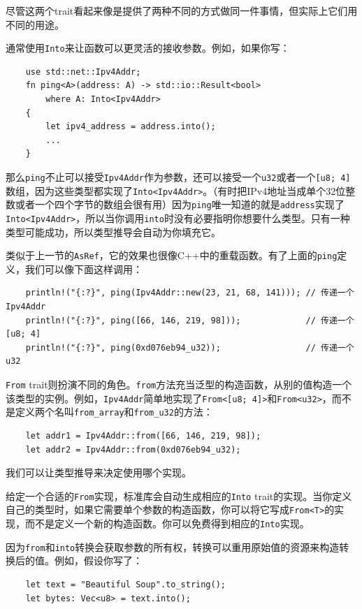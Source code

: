 尽管这两个trait看起来像是提供了两种不同的方式做同一件事情，但实际上它们用不同的用途。

通常使用\texttt{Into}来让函数可以更灵活的接收参数。例如，如果你写：
\begin{verbatim}
    use std::net::Ipv4Addr;
    fn ping<A>(address: A) -> std::io::Result<bool>
        where A: Into<Ipv4Addr>
    {
        let ipv4_address = address.into();
        ...
    }
\end{verbatim}

那么\texttt{ping}不止可以接受\texttt{Ipv4Addr}作为参数，还可以接受一个\texttt{u32}或者一个\texttt{[u8; 4]}数组，因为这些类型都实现了\texttt{Into<Ipv4Addr>}。（有时把IPv4地址当成单个32位整数或者一个四个字节的数组会很有用）因为\texttt{ping}唯一知道的就是\texttt{address}实现了\texttt{Into<Ipv4Addr>}，所以当你调用\texttt{into}时没有必要指明你想要什么类型。只有一种类型可能成功，所以类型推导会自动为你填充它。

类似于上一节的\texttt{AsRef}，它的效果也很像C++中的重载函数。有了上面的\texttt{ping}定义，我们可以像下面这样调用：
\begin{verbatim}
    println!("{:?}", ping(Ipv4Addr::new(23, 21, 68, 141))); // 传递一个Ipv4Addr
    println!("{:?}", ping([66, 146, 219, 98]));             // 传递一个[u8; 4]
    println!("{:?}", ping(0xd076eb94_u32));                 // 传递一个u32
\end{verbatim}

\texttt{From} trait则扮演不同的角色。\texttt{from}方法充当泛型的构造函数，从别的值构造一个该类型的实例。例如，\texttt{Ipv4Addr}简单地实现了\texttt{From<[u8; 4]>}和\texttt{From<u32>}，而不是定义两个名叫\texttt{from\_array}和\texttt{from\_u32}的方法：
\begin{verbatim}
    let addr1 = Ipv4Addr::from([66, 146, 219, 98]);
    let addr2 = Ipv4Addr::from(0xd076eb94_u32);
\end{verbatim}

我们可以让类型推导来决定使用哪个实现。

给定一个合适的\texttt{From}实现，标准库会自动生成相应的\texttt{Into} trait的实现。当你定义自己的类型时，如果它需要单个参数的构造函数，你可以将它写成\texttt{From<T>}的实现，而不是定义一个新的构造函数。你可以免费得到相应的\texttt{Into}实现。

因为\texttt{from}和\texttt{into}转换会获取参数的所有权，转换可以重用原始值的资源来构造转换后的值。例如，假设你写了：
\begin{verbatim}
    let text = "Beautiful Soup".to_string();
    let bytes: Vec<u8> = text.into();
\end{verbatim}


